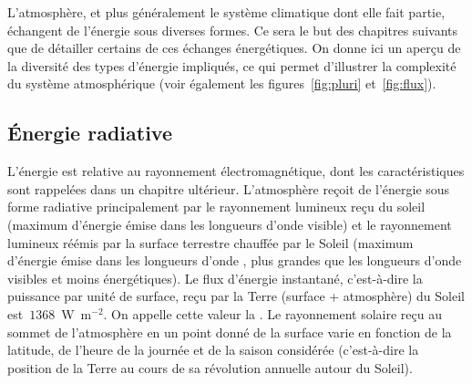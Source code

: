 \sk
L'atmosphère, et plus généralement le système climatique dont elle fait partie, échangent de l'énergie sous diverses formes. Ce sera le but des chapitres suivants que de détailler certains de ces échanges énergétiques. On donne ici un aperçu de la diversité des types d'énergie impliqués, ce qui permet d'illustrer la complexité du système atmosphérique (voir également les figures~\ref{fig:pluri} et~\ref{fig:flux}). 


\sk
\subsection{\'Energie radiative}\label{sec:energrad}

\sk
L'énergie  est relative au rayonnement électromagnétique, dont les caractéristiques sont rappelées dans un chapitre ultérieur. L'atmosphère reçoit de l'énergie sous forme radiative principalement par le rayonnement lumineux reçu du soleil (maximum d'énergie émise dans les longueurs d'onde visible) et le rayonnement lumineux réémis par la surface terrestre chauffée par le Soleil (maximum d'énergie émise dans les longueurs d'onde , plus grandes que les longueurs d'onde visibles et moins énergétiques). Le flux d'énergie instantané, c'est-à-dire la puissance par unité de surface, reçu par la Terre (surface + atmosphère) du Soleil est~$1368$~W~m$^{-2}$. On appelle cette valeur la . Le rayonnement solaire reçu au sommet de l'atmosphère en un point donné de la surface varie en fonction de la latitude, de l'heure de la journée et de la saison considérée (c'est-à-dire la position de la Terre au cours de sa révolution annuelle autour du Soleil). %

